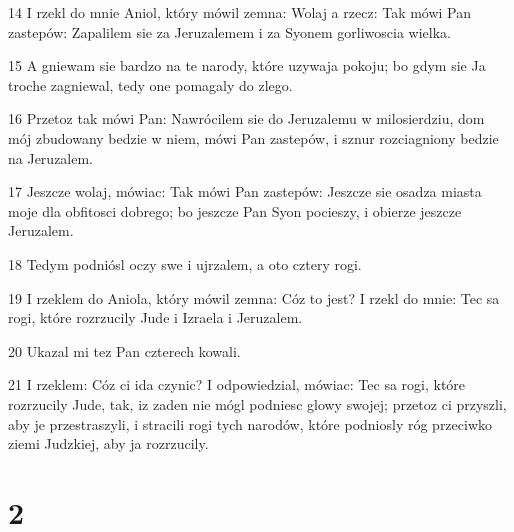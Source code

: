 \par 14 I rzekl do mnie Aniol, który mówil zemna: Wolaj a rzecz: Tak mówi Pan zastepów: Zapalilem sie za Jeruzalemem i za Syonem gorliwoscia wielka.
\par 15 A gniewam sie bardzo na te narody, które uzywaja pokoju; bo gdym sie Ja troche zagniewal, tedy one pomagaly do zlego.
\par 16 Przetoz tak mówi Pan: Nawrócilem sie do Jeruzalemu w milosierdziu, dom mój zbudowany bedzie w niem, mówi Pan zastepów, i sznur rozciagniony bedzie na Jeruzalem.
\par 17 Jeszcze wolaj, mówiac: Tak mówi Pan zastepów: Jeszcze sie osadza miasta moje dla obfitosci dobrego; bo jeszcze Pan Syon pocieszy, i obierze jeszcze Jeruzalem.
\par 18 Tedym podniósl oczy swe i ujrzalem, a oto cztery rogi.
\par 19 I rzeklem do Aniola, który mówil zemna: Cóz to jest? I rzekl do mnie: Tec sa rogi, które rozrzucily Jude i Izraela i Jeruzalem.
\par 20 Ukazal mi tez Pan czterech kowali.
\par 21 I rzeklem: Cóz ci ida czynic? I odpowiedzial, mówiac: Tec sa rogi, które rozrzucily Jude, tak, iz zaden nie mógl podniesc glowy swojej; przetoz ci przyszli, aby je przestraszyli, i stracili rogi tych narodów, które podniosly róg przeciwko ziemi Judzkiej, aby ja rozrzucily.

\chapter{2}

